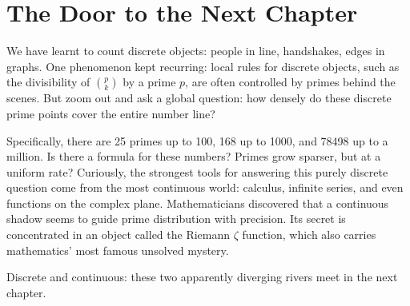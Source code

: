 \section*{The Door to the Next Chapter}

We have learnt to count discrete objects: people in line, handshakes, edges in graphs. One phenomenon kept recurring: local rules for discrete objects, such as the divisibility of $\binom{p}{k}$ by a prime $p$, are often controlled by primes behind the scenes. But zoom out and ask a global question: how densely do these discrete prime points cover the entire number line?

Specifically, there are 25 primes up to 100, 168 up to 1000, and 78498 up to a million. Is there a formula for these numbers? Primes grow sparser, but at a uniform rate? Curiously, the strongest tools for answering this purely discrete question come from the most continuous world: calculus, infinite series, and even functions on the complex plane. Mathematicians discovered that a continuous shadow seems to guide prime distribution with precision. Its secret is concentrated in an object called the Riemann $\zeta$ function, which also carries mathematics' most famous unsolved mystery.

Discrete and continuous: these two apparently diverging rivers meet in the next chapter.
